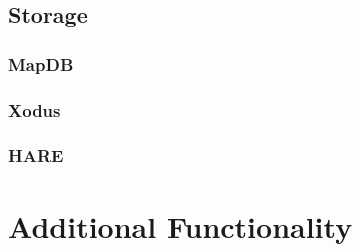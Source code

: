 \subsection{Storage}
\subsubsection{MapDB}
\subsubsection{Xodus}
\subsubsection{HARE}



\section{Additional Functionality}

